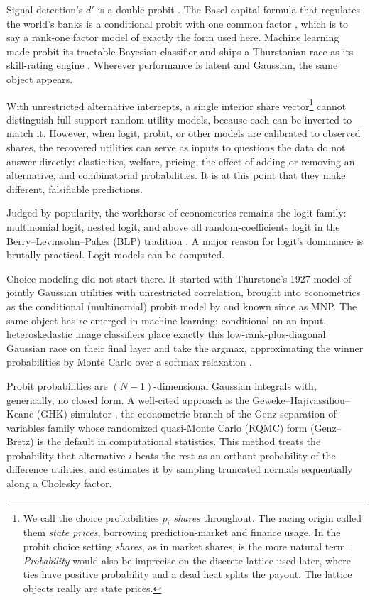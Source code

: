 \documentclass[12pt]{article}
\theoremstyle{remark}
\begin{document}
Signal detection's $d'$ is a
double probit \citep{green1966}. The Basel capital formula that
regulates the world's banks is a conditional probit with one common
factor \citep{vasicek2002,gordy2003}, which is to say a rank-one factor
model of exactly the form used here. Machine learning made probit its
tractable Bayesian classifier \citep{albertchib1993} and ships a
Thurstonian race as its skill-rating engine \citep{herbrich2006}.
Wherever performance is latent and Gaussian, the same object appears.

With unrestricted alternative intercepts, a single interior share
vector\footnote{We call the choice probabilities $p_i$ \emph{shares} throughout. The racing origin \citep{cotton2021} called them \emph{state prices}, borrowing prediction-market and finance usage. In the probit choice setting \emph{shares}, as in market shares, is the more natural term. \emph{Probability} would also be imprecise on the discrete lattice used later, where ties have positive probability and a dead heat splits the payout. The lattice objects really are state prices.} cannot distinguish full-support random-utility models, because
each can be inverted to match it. However, when logit, probit, or other models are calibrated to observed shares, the recovered utilities can serve as inputs to questions the data do not answer
directly: elasticities, welfare, pricing, the effect of adding or
removing an alternative, and combinatorial probabilities. It is at this point that they make different, falsifiable predictions. 

Judged by popularity, the workhorse of econometrics
remains the logit family: multinomial logit,
nested logit, and above all random-coefficients logit in the Berry--Levinsohn--Pakes (BLP) tradition
\citep{berry1995,train2009,conlon2020}. A major reason for logit's dominance is brutally practical. Logit
models can be computed.

Choice modeling did not start there. It started with Thurstone's 1927 model
\citep{thurstone1927} of jointly Gaussian utilities with unrestricted
correlation, brought into econometrics as the conditional (multinomial)
probit model by \citet{hausman1978} and known since as MNP. The same
object has re-emerged in machine learning: conditional on an input,
heteroskedastic image classifiers place exactly this
low-rank-plus-diagonal Gaussian race on their final layer and take the
argmax, approximating the winner probabilities by Monte Carlo over a
softmax relaxation \citep{collier2021}.

Probit probabilities are $(N-1)$-dimensional Gaussian integrals with,
generically, no closed form. A well-cited approach is the Geweke--Hajivassiliou--Keane
(GHK) simulator \citep{geweke1994,hajivassiliou1998,train2009}, the
econometric branch of the Genz separation-of-variables family
\citep{genz1992} whose randomized quasi-Monte Carlo (RQMC) form
(Genz--Bretz) is the default in
computational statistics.  This method treats
the probability that alternative $i$ beats the rest as an orthant
probability of the difference utilities, and estimates it by sampling
truncated normals sequentially along a Cholesky factor.
\end{document}
